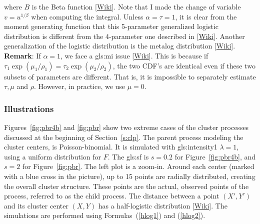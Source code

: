 \documentclass[10pt]{article}
\begin{document}
where $B$ is the \textcolor{index}{Beta function} [\href{https://en.wikipedia.org/wiki/Beta_function}{Wiki}]. Note that I made the change of variable $v=u^{1/\beta}$ when computing the integral. Unless $\alpha=\tau=1$, it is clear from the moment generating function that this 5-parameter \textcolor{index}{generalized logistic distribution}  is different from the
4-parameter one described in [\href{https://en.wikipedia.org/wiki/Generalized_logistic_distribution}{Wiki}]. Another generalization of the logistic distribution is the 
\textcolor{index}{metalog distribution} [\href{https://en.wikipedia.org/wiki/Metalog_distribution}{Wiki}].\vspace{1ex} \\
{\bf Remark}: If $\alpha=1$, we face a 
\gls{gls:mi} %
 issue [\href{https://en.wikipedia.org/wiki/Identifiability}{Wiki}]. This is because if $\tau_1\exp(\mu_1/\rho_1)=\tau_2\exp(\mu_2/\rho_2)$, the two CDF's are identical even if these two subsets of parameters are different. That is, it is impossible to separately estimate $\tau,\mu$ and $\rho$. However, in practice, we use $\mu=0$.


\subsubsection{Illustrations}\label{illus}

Figures~\ref{fig:pbr4b} and \ref{fig:pbr} show two extreme cases of the cluster processes discussed at the beginning of Section~\ref{s:clp}. The parent process modeling the cluster centers, is Poisson-binomial. It is simulated with  \gls{gls:intensity1} $\lambda=1$, using a uniform distribution for $F$. The \gls{gls:sf} is $s=0.2$ for Figure~\ref{fig:pbr4b}, and
$s=2$ for Figure~\ref{fig:pbr}. The left plot is a zoom-in. Around each center (marked with a blue cross in the picture), up to 15 points are radially distributed, creating the overall cluster structure. These points are the actual, observed points of the process, referred to as the child process. 
The distance between a point $(X', Y')$ and its cluster center $(X,Y)$ 
has a \textcolor{index}{half-logistic distribution} 
[\href{https://en.wikipedia.org/wiki/Half-logistic_distribution}{Wiki}]. The simulations are performed
using Formulas~(\ref{hlog1}) and (\ref{hlog2}).
\end{document}
